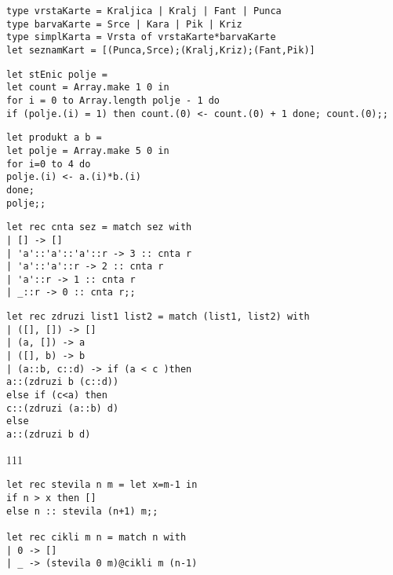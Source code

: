 \begin{Odgovor}{44}
\begin{verbatim}
type vrstaKarte = Kraljica | Kralj | Fant | Punca
type barvaKarte = Srce | Kara | Pik | Kriz
type simplKarta = Vrsta of vrstaKarte*barvaKarte
let seznamKart = [(Punca,Srce);(Kralj,Kriz);(Fant,Pik)]
\end{verbatim}
\end{Odgovor}
\begin{Odgovor}{49}
\begin{verbatim}
let stEnic polje =
let count = Array.make 1 0 in
for i = 0 to Array.length polje - 1 do
if (polje.(i) = 1) then count.(0) <- count.(0) + 1 done; count.(0);;
\end{verbatim}
\end{Odgovor}
\begin{Odgovor}{50}
\begin{verbatim}
let produkt a b =
let polje = Array.make 5 0 in
for i=0 to 4 do
polje.(i) <- a.(i)*b.(i)
done;
polje;;
\end{verbatim}
\end{Odgovor}
\begin{Odgovor}{79}
\begin{verbatim}
let rec cnta sez = match sez with
| [] -> []
| 'a'::'a'::'a'::r -> 3 :: cnta r
| 'a'::'a'::r -> 2 :: cnta r
| 'a'::r -> 1 :: cnta r
| _::r -> 0 :: cnta r;;
\end{verbatim}
\end{Odgovor}
\begin{Odgovor}{99}
\begin{verbatim}
let rec zdruzi list1 list2 = match (list1, list2) with
| ([], []) -> []
| (a, []) -> a
| ([], b) -> b
| (a::b, c::d) -> if (a < c )then
a::(zdruzi b (c::d))
else if (c<a) then
c::(zdruzi (a::b) d)
else
a::(zdruzi b d)
\end{verbatim}
\end{Odgovor}
\begin{Odgovor}{111}
\begin{verbatim}
let rec stevila n m = let x=m-1 in
if n > x then []
else n :: stevila (n+1) m;;

let rec cikli m n = match n with
| 0 -> []
| _ -> (stevila 0 m)@cikli m (n-1)
\end{verbatim}
\end{Odgovor}
